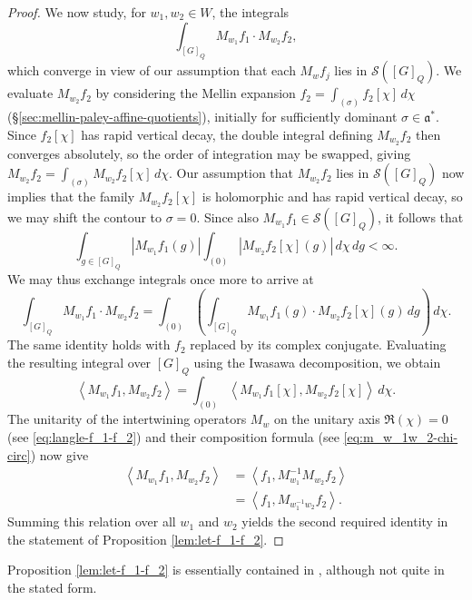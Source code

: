 \documentclass[reqno]{amsart}
\theoremstyle{plain} \newtheorem{theorem} {Theorem}
\theoremstyle{definition} \newtheorem{definition} [theorem] {Definition}
\theoremstyle{itplain} %
\numberwithin{equation}{section}
\numberwithin{theorem}{section}
\begin{document}
\begin{proof}
  We now study, for $w_1, w_2 \in W$, the integrals
  \begin{equation*}
    \int _{[G]_Q} M_{w_1} f_1 \cdot M_{w_2} f_2,
  \end{equation*}
  which converge in view of our assumption that each $M_w f_j$ lies in $\mathcal{S}([G]_Q)$.  We evaluate $M_{w_2} f_2$ by considering the Mellin expansion $f_2 = \int _{(\sigma)} f_2[\chi] \, d \chi$ (\S\ref{sec:mellin-paley-affine-quotients}), initially for sufficiently dominant $\sigma \in \mathfrak{a}^*$.  Since $f_2[\chi]$ has rapid vertical decay, the double integral defining $M_{w_2} f_2$ then converges absolutely, so the order of integration may be swapped, giving $M_{w_2} f_2 = \int _{(\sigma)} M_{w_2} f_2[\chi] \, d \chi$.  Our assumption that $M_{w_2} f_2$ lies in $\mathcal{S}([G]_Q)$ now implies that the family $M_{w_2} f_2[\chi]$ is holomorphic and has rapid vertical decay, so we may shift the contour to $\sigma = 0$.  Since also $M_{w_1} f_1 \in \mathcal{S}([G]_Q)$, it follows that
  \begin{equation*}
    \int _{g \in [G]_Q} |M_{w_1} f_1(g)| \int _{(0)} \left\lvert M_{w_2} f_2[\chi](g)  \right\rvert \, d \chi \, d g < \infty.
  \end{equation*}
  We may thus exchange integrals once more to arrive at
  \begin{equation*}
    \int _{[G]_Q} M_{w_1} f_1 \cdot M_{w_2} f_2
    = \int _{(0)} \left( \int _{[G]_Q} M_{w_1} f_1(g) \cdot M_{w_2} f_2[\chi](g) \, d g \right) \, d \chi.
  \end{equation*}
  The same identity holds with $f_2$ replaced by its complex conjugate.  Evaluating the resulting integral over $[G]_Q$ using the Iwasawa decomposition, we obtain
  \begin{equation*}
    \left\langle M_{w_1} f_1, M_{w_2} f_2 \right\rangle
    =
    \int _{(0)}
    \left\langle M_{w_1} f_1[\chi], M_{w_2} f_2[\chi] \right\rangle \, d \chi.
  \end{equation*}
  The unitarity of the intertwining operators $M_w$ on the unitary axis $\Re(\chi) = 0$ (see \eqref{eq:langle-f_1-f_2}) and their composition formula (see \eqref{eq:m_w_1w_2-chi-circ}) now give
  \begin{align*}
    \left\langle M_{w_1} f_1, M_{w_2} f_2 \right\rangle
    &=
    \left\langle f_1, M_{w_1}^{-1} M_{w_2} f_2 \right\rangle \\
    &=
    \left\langle f_1, M_{w_1^{-1} w_2} f_2 \right\rangle.
  \end{align*}
  Summing this relation over all $w_1$ and $w_2$ yields the second required identity in the statement of Proposition \ref{lem:let-f_1-f_2}.
\end{proof}
\begin{remark}
  Proposition \ref{lem:let-f_1-f_2} is essentially contained in \cite[\S3.6.6, p384]{MR3468638},  although not quite in the stated form.
\end{remark}
\end{document}

